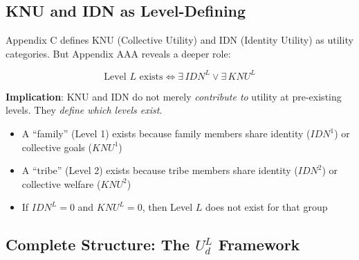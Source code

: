 \subsection{KNU and IDN as Level-Defining}

\begin{tcolorbox}[colback=yellow!5!white, colframe=yellow!75!black, 
    title=Critical Connection: KNU/IDN Define Levels (AAA Axiom AL-2)]
Appendix C defines KNU (Collective Utility) and IDN (Identity Utility) as 
utility categories. But Appendix AAA reveals a deeper role:

\begin{equation}
\boxed{\text{Level } L \text{ exists} \iff \exists \, IDN^L \lor \exists \, KNU^L}
\end{equation}

\textbf{Implication}: KNU and IDN do not merely \textit{contribute to} utility at 
pre-existing levels. They \textit{define which levels exist}.

\begin{itemize}[nosep]
\item A ``family'' (Level 1) exists because family members share identity ($IDN^1$) 
      or collective goals ($KNU^1$)
\item A ``tribe'' (Level 2) exists because tribe members share identity ($IDN^2$) 
      or collective welfare ($KNU^2$)
\item If $IDN^L = 0$ and $KNU^L = 0$, then Level $L$ does not exist for that group
\end{itemize}
\end{tcolorbox}

\subsection{Complete Structure: The $U^L_d$ Framework}

